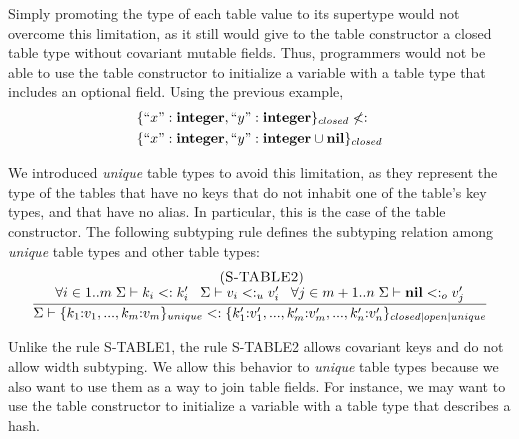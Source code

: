 Simply promoting the type of each table value to its supertype would
not overcome this limitation, as it still would give to the table constructor
a closed table type without covariant mutable fields.
Thus, programmers would not be able to use the table constructor to
initialize a variable with a table type that includes an optional field.
Using the previous example,
\begin{align*}
& \{``x":\mathbf{integer}, ``y":\mathbf{integer}\}_{closed} \not<: \\
& \{``x":\mathbf{integer}, ``y":\mathbf{integer} \cup \mathbf{nil}\}_{closed}
\end{align*}

We introduced \emph{unique} table types to avoid this limitation,
as they represent the type of the tables that have no keys that do not
inhabit one of the table's key types, and that have no alias.
In particular, this is the case of the table constructor.
The following subtyping rule defines the subtyping relation among
\emph{unique} table types and other table types:
\[
\begin{array}{c}
\; (\textsc{S-TABLE2})\\
\dfrac{\forall i \in 1..m \; \Sigma \vdash k_{i} <: k_{i}' \;\;\;
       \Sigma \vdash v_{i} <:_{u} v_{i}' \;\;\;
       \forall j \in m+1..n \; \Sigma \vdash \mathbf{nil} <:_{o} v_{j}'}
      {\Sigma \vdash \{k_{1}{:}v_{1}, ..., k_{m}{:}v_{m}\}_{unique} <:
                    \{k_{1}'{:}v_{1}', ..., k_{m}'{:}v_{m}', ..., k_{n}'{:}v_{n}'\}_{closed|open|unique}}
\end{array}
\]

Unlike the rule \textsc{S-TABLE1}, the rule \textsc{S-TABLE2} allows
covariant keys and do not allow width subtyping.
We allow this behavior to \emph{unique} table types because we also
want to use them as a way to join table fields.
For instance, we may want to use the table constructor to initialize
a variable with a table type that describes a hash.

